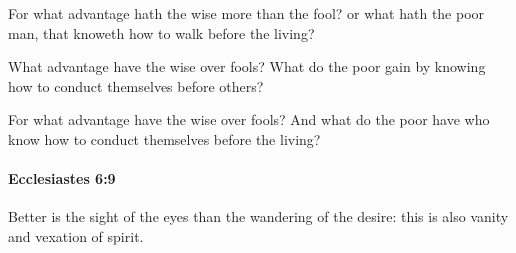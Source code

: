 			\begin{versebox}
					\item[BHS] 
					\item[LXX] 
					\item[ASV] For what advantage hath the wise more than the fool? or what hath the poor man, that knoweth how to walk before the living?
					\item[NIV] What advantage have the wise over fools? What do the poor gain by knowing how to conduct themselves before others?
					\item[NRSV] For what advantage have the wise over fools? And what do the poor have who know how to conduct themselves before the living?
			\end{versebox}

		\paragraph{Ecclesiastes 6:9} %
			\label{ECCLESIASTES-6-9}

			Better is the sight of the eyes than the wandering of the desire: this is also vanity and vexation of spirit.

